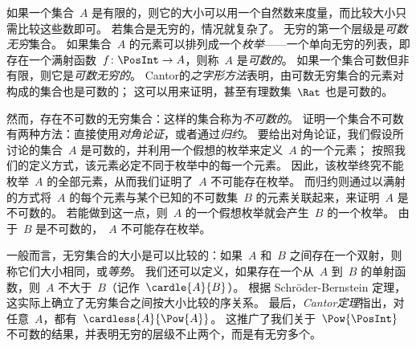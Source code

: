 如果一个集合~$A$ 是有限的，则它的大小可以用一个自然数来度量，而比较大小只需比较这些数即可。
若集合是无穷的，情况就复杂了。
无穷的第一个层级是\emph{可数无穷}集合。
如果集合~$A$ 的元素可以排列成一个\emph{枚举}——一个单向无穷的列表，即存在一个满射函数~$f\colon \PosInt \to A$，则称~$A$ 是\emph{可数的}。
如果一个集合可数但非有限，则它是\emph{可数无穷的}。
Cantor的\emph{之字形方法}表明，由可数无穷集合的元素对构成的集合也是可数的；
这可以用来证明，甚至有理数集~$\Rat$ 也是可数的。

然而，存在不可数的无穷集合：这样的集合称为\emph{不可数的}。
证明一个集合不可数有两种方法：直接使用\emph{对角论证}，或者通过\emph{归约}。
要给出对角论证，我们假设所讨论的集合~$A$ 是可数的，并利用一个假想的枚举来定义~$A$ 的一个元素；
按照我们的定义方式，该元素必定不同于枚举中的每一个元素。
因此，该枚举终究不能枚举~$A$ 的全部元素，从而我们证明了~$A$ 不可能存在枚举。
而归约则通过以满射的方式将~$A$ 的每个元素与某个已知的不可数集~$B$ 的元素关联起来，来证明~$A$ 是不可数的。
若能做到这一点，则~$A$ 的一个假想枚举就会产生~$B$ 的一个枚举。
由于~$B$ 是不可数的，~$A$ 不可能存在枚举。

一般而言，无穷集合的大小是可以比较的：如果~$A$ 和~$B$ 之间存在一个双射，则称它们大小相同，或\emph{等势}。
我们还可以定义，如果存在一个从~$A$ 到~$B$ 的单射函数，则~$A$ 不大于~$B$（记作~$\cardle{A}{B}$）。
根据 Schröder-Bernstein 定理，这实际上确立了无穷集合之间按大小比较的序关系。
最后，\emph{Cantor定理}指出，对任意~$A$，都有~$\cardless{A}{\Pow{A}}$。
这推广了我们关于~$\Pow{\PosInt}$ 不可数的结果，并表明无穷的层级不止两个，而是有无穷多个。